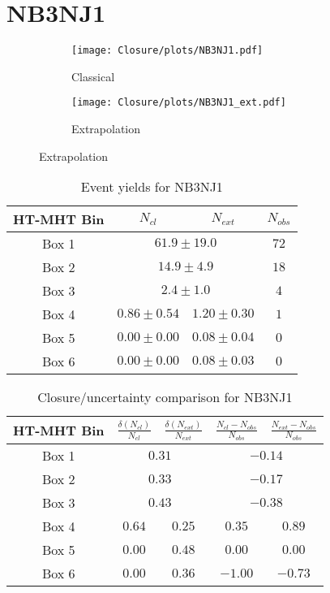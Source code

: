 \documentclass[11pt, oneside]{article}
\begin{document}
\clearpage


\section{NB3NJ1}

\begin{figure}[h]
\centering
\caption{NB3NJ1}
\begin{subfigure}[b]{0.49\textwidth}
\texttt{[image: Closure/plots/NB3NJ1.pdf]}
\caption{Classical}
\end{subfigure}
\begin{subfigure}[b]{0.49\textwidth}
\texttt{[image: Closure/plots/NB3NJ1\_ext.pdf]}
\caption{Extrapolation}
\end{subfigure}
\end{figure}


\begin{table}[h]
\centering
\caption{Event yields for NB3NJ1}
\begin{tabular}{|c|c|c|c|}
\hline
HT-MHT Bin & $N_{cl}$ & $N_{ext}$ & $N_{obs}$ \\
\hline
Box 1 & \multicolumn{2}{c|}{$61.9\pm19.0$} & $ 72$ \\ 
Box 2 & \multicolumn{2}{c|}{$14.9\pm4.9$} & $ 18$ \\ 
Box 3 & \multicolumn{2}{c|}{$2.4\pm1.0$} & $  4$ \\ 
\hline 
Box 4 & $0.86\pm0.54$ & $1.20\pm0.30$ & $  1$ \\ 
Box 5 & $0.00\pm0.00$ & $0.08\pm0.04$ & $  0$ \\ 
Box 6 & $0.00\pm0.00$ & $0.08\pm0.03$ & $  0$ \\ 
\hline
\end{tabular}
\end{table}


\begin{table}[h]
\centering
\caption{Closure/uncertainty comparison for NB3NJ1}
\begin{tabular}{|c|c|c|c|c|}
\hline
HT-MHT Bin & $\frac{\delta(N_{cl})}{N_{cl}}$ & $\frac{\delta(N_{ext})}{N_{ext}}$ & $\frac{N_{cl}-N_{obs}}{N_{obs}}$ &  $\frac{N_{ext}-N_{obs}}{N_{obs}}$ \\
\hline
Box 1 & \multicolumn{2}{c|}{$0.31$} & \multicolumn{2}{c|}{$-0.14$} \\ 
Box 2 & \multicolumn{2}{c|}{$0.33$} & \multicolumn{2}{c|}{$-0.17$} \\ 
Box 3 & \multicolumn{2}{c|}{$0.43$} & \multicolumn{2}{c|}{$-0.38$} \\ 
\hline 
Box 4 & $0.64$ & $0.25$ & $0.35$ & $0.89$ \\ 
Box 5 & $0.00$ & $0.48$ & $0.00$ & $0.00$ \\ 
Box 6 & $0.00$ & $0.36$ & $-1.00$ & $-0.73$ \\ 
\hline
\end{tabular}
\end{table}
\end{document}
